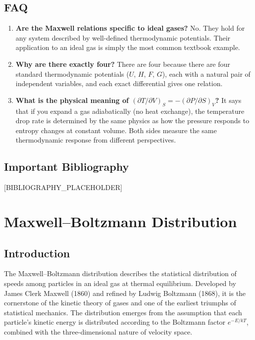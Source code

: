 \documentclass[11pt,openright]{book}
\begin{document}
\section*{FAQ}

\begin{enumerate}
\item \textbf{Are the Maxwell relations specific to ideal gases?}
No. They hold for any system described by well-defined thermodynamic potentials. Their application to an ideal gas is simply the most common textbook example.

\item \textbf{Why are there exactly four?}
There are four because there are four standard thermodynamic potentials ($U$, $H$, $F$, $G$), each with a natural pair of independent variables, and each exact differential gives one relation.

\item \textbf{What is the physical meaning of $(\partial T/\partial V)_{S} = -(\partial P/\partial S)_{V}$?}
It says that if you expand a gas adiabatically (no heat exchange), the temperature drop rate is determined by the same physics as how the pressure responds to entropy changes at constant volume. Both sides measure the same thermodynamic response from different perspectives.
\end{enumerate}
\section*{Important Bibliography}

[BIBLIOGRAPHY_PLACEHOLDER]


\chapter{Maxwell--Boltzmann Distribution}

\section*{Introduction}

The Maxwell--Boltzmann distribution describes the statistical distribution of speeds among particles in an ideal gas at thermal equilibrium. Developed by James Clerk Maxwell (1860) and refined by Ludwig Boltzmann (1868), it is the cornerstone of the kinetic theory of gases and one of the earliest triumphs of statistical mechanics. The distribution emerges from the assumption that each particle's kinetic energy is distributed according to the Boltzmann factor $e^{-E/kT}$, combined with the three-dimensional nature of velocity space.
\end{document}
